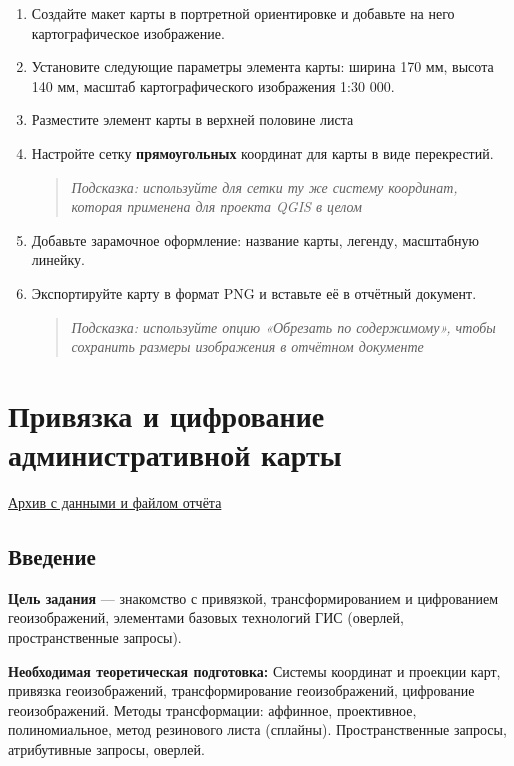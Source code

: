 \documentclass[
  12pt,
]{book}
\begin{document}
\begin{enumerate}
\def\labelenumi{\arabic{enumi}.}
\setcounter{enumi}{6}
\item
  Создайте макет карты в портретной ориентировке и добавьте на него картографическое изображение.
\item
  Установите следующие параметры элемента карты: ширина 170 мм, высота 140 мм, масштаб картографического изображения 1:30 000.
\item
  Разместите элемент карты в верхней половине листа
\item
  Настройте сетку \textbf{прямоугольных} координат для карты в виде перекрестий.

  \begin{quote}
  \emph{Подсказка: используйте для сетки ту же систему координат, которая применена для проекта QGIS в целом}
  \end{quote}
\item
  Добавьте зарамочное оформление: название карты, легенду, масштабную линейку.
\item
  Экспортируйте карту в формат PNG и вставьте её в отчётный документ.

  \begin{quote}
  \emph{Подсказка: используйте опцию «Обрезать по содержимому», чтобы сохранить размеры изображения в отчётном документе}
  \end{quote}
\end{enumerate}

\hypertarget{map-ref-districts}{%
\chapter{Привязка и цифрование административной карты}\label{map-ref-districts}}

\href{https://1drv.ms/u/s!AmtmZDq3JgxHgZUEGskg6DlUfpKdug?e=n6tNQA}{Архив с данными и файлом отчёта}

\hypertarget{map-ref-districts-intro}{%
\section{Введение}\label{map-ref-districts-intro}}

\textbf{Цель задания} --- знакомство с привязкой, трансформированием и цифрованием геоизображений, элементами базовых технологий ГИС (оверлей, пространственные запросы).

\textbf{Необходимая теоретическая подготовка:} Системы координат и проекции карт, привязка геоизображений, трансформирование геоизображений, цифрование геоизображений. Методы трансформации: аффинное, проективное, полиномиальное, метод резинового листа (сплайны). Пространственные запросы, атрибутивные запросы, оверлей.
\end{document}
